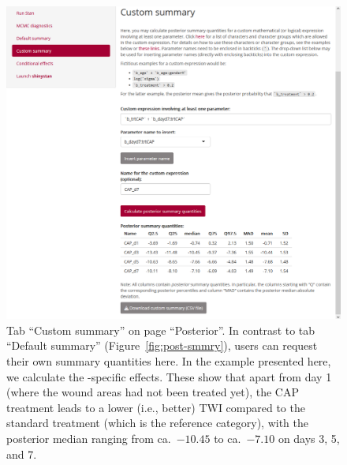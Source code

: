 \begin{figure}[t!]
  \centering
  \includegraphics[width=\textwidth]{Figures/Posterior_CustSummary.png}
  \caption[Tab ``Custom summary'']{Tab ``Custom summary'' on page ``Posterior''.
  In contrast to tab ``Default summary'' (Figure~\ref{fig:post-smmry}), users
  can request their own summary quantities here. In the example presented here,
  we calculate the -specific  effects. These show that apart
  from day 1 (where the wound areas had not been treated yet), the CAP treatment
  leads to a lower (i.e., better) TWI compared to the standard treatment (which
  is the reference category), with the posterior median ranging from
  ca.~$-10.45$ to ca.~$-7.10$ on days 3, 5, and 7.}
  \label{fig:post-custsmmry}
\end{figure}%
